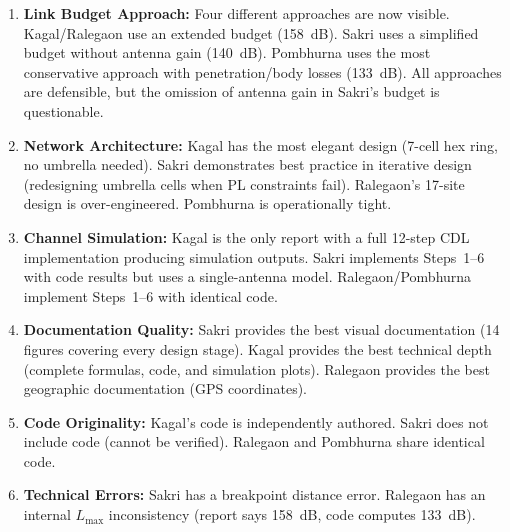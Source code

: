 \documentclass[11pt,a4paper]{article}
\begin{document}
\begin{enumerate}
    \item \textbf{Link Budget Approach:} Four different approaches are now visible. Kagal/Ralegaon use an extended budget (158~dB). Sakri uses a simplified budget without antenna gain (140~dB). Pombhurna uses the most conservative approach with penetration/body losses (133~dB). All approaches are defensible, but the omission of antenna gain in Sakri's budget is questionable.

    \item \textbf{Network Architecture:} Kagal has the most elegant design (7-cell hex ring, no umbrella needed). Sakri demonstrates best practice in iterative design (redesigning umbrella cells when PL constraints fail). Ralegaon's 17-site design is over-engineered. Pombhurna is operationally tight.

    \item \textbf{Channel Simulation:} Kagal is the only report with a full 12-step CDL implementation producing simulation outputs. Sakri implements Steps~1--6 with code results but uses a single-antenna model. Ralegaon/Pombhurna implement Steps~1--6 with identical code.

    \item \textbf{Documentation Quality:} Sakri provides the best visual documentation (14 figures covering every design stage). Kagal provides the best technical depth (complete formulas, code, and simulation plots). Ralegaon provides the best geographic documentation (GPS coordinates).

    \item \textbf{Code Originality:} Kagal's code is independently authored. Sakri does not include code (cannot be verified). Ralegaon and Pombhurna share identical code.

    \item \textbf{Technical Errors:} Sakri has a breakpoint distance error. Ralegaon has an internal $L_{\max}$ inconsistency (report says 158~dB, code computes 133~dB).
\end{enumerate}
\end{document}
